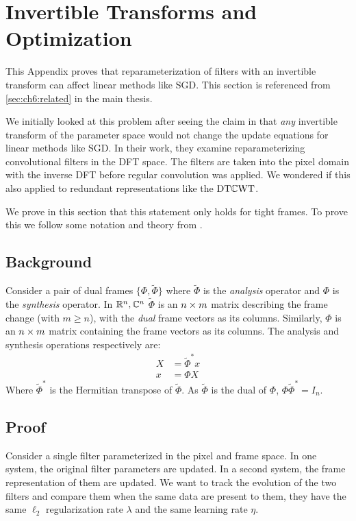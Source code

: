 \chapter{Invertible Transforms and Optimization} \label{appC:invertible}
\def \path {freqlearn/}
\def \imgpath {freqlearn/images}

This Appendix proves that reparameterization of filters with an invertible
transform can affect linear methods like SGD. This section is referenced from 
\autoref{sec:ch6:related} in the main thesis.

We initially looked at this problem after seeing the claim in
\cite{rippel_spectral_2015} that \emph{any} invertible transform of the parameter
space would not change the update equations for linear methods like SGD. In
their work, they examine reparameterizing convolutional filters in the DFT
space. The filters are taken into the pixel domain with the inverse DFT before
regular convolution was applied. We wondered if this also applied to redundant
representations like the $\DTCWT$.

We prove in this section that this statement only holds for tight frames.
To prove this we follow some notation and theory from 
\cite{kovacevic_introduction_2008}.

\section{Background}
Consider a pair of dual frames $\{\Phi, \tilde{\Phi}\}$ where $\tilde{\Phi}$ is
the \emph{analysis} operator and $\Phi$ is the \emph{synthesis} operator. 
In $\reals[n], \complexes[n]$ $\tilde{\Phi}$ is an $n\x m$ matrix describing the
frame change (with $m \geq n$), with the \emph{dual} frame vectors as its columns.
Similarly, $\Phi$ is an $n\x m$ matrix containing the frame vectors as its
columns. The analysis and synthesis operations respectively are:
\begin{align}
  X &= \tilde{\Phi}^* x \label{eq:appC:analysis}\\
  x &= \Phi X \label{eq:appC:synthesis}
\end{align}
Where $\tilde{\Phi}^*$ is the Hermitian transpose of $\tilde{\Phi}$. As
$\tilde{\Phi}$ is the dual of $\Phi$, $\Phi \tilde{\Phi}^* = I_n$.

\section{Proof}
Consider a single filter parameterized in the pixel and frame space. In one
system, the original filter parameters are updated. In a second system, the
frame representation of them are updated. We want to track the evolution of the
two filters and compare them when the same data are present to them, they have
the same $\ell_2$ regularization rate $\lambda$ and the same learning rate $\eta$.

